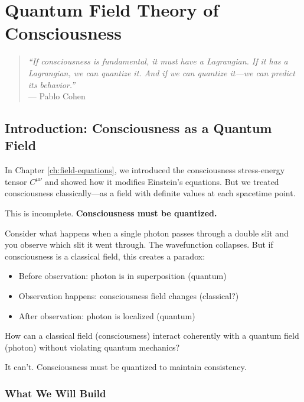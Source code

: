 \chapter{Quantum Field Theory of Consciousness}
\label{ch:qft-consciousness}

\begin{quote}
\textit{``If consciousness is fundamental, it must have a Lagrangian. If it has a Lagrangian, we can quantize it. And if we can quantize it—we can predict its behavior.''} \\
--- Pablo Cohen
\end{quote}

\section{Introduction: Consciousness as a Quantum Field}

In Chapter \ref{ch:field-equations}, we introduced the consciousness stress-energy tensor $C^{\mu\nu}$ and showed how it modifies Einstein's equations. But we treated consciousness classically—as a field with definite values at each spacetime point.

This is incomplete. \textbf{Consciousness must be quantized.}

\begin{intuitive}
Consider what happens when a single photon passes through a double slit and you observe which slit it went through. The wavefunction collapses. But if consciousness is a classical field, this creates a paradox:

\begin{itemize}
\item Before observation: photon is in superposition (quantum)
\item Observation happens: consciousness field changes (classical?)
\item After observation: photon is localized (quantum)
\end{itemize}

How can a classical field (consciousness) interact coherently with a quantum field (photon) without violating quantum mechanics?

It can't. Consciousness must be quantized to maintain consistency.
\end{intuitive}

\subsection{What We Will Build}

